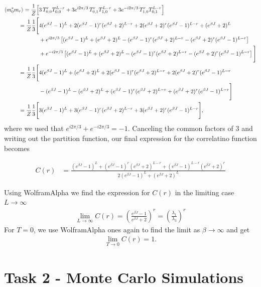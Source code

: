\documentclass[reprint,english,notitlepage,aps,nobalancelastpage,nofootinbib]{revtex4-1}
\newcommand{\closed}[1]{\left(#1\right)}
\newcommand{\bracket}[1]{\left[#1\right]}
\newcommand{\ebj}{e^{\beta J}}
\renewcommand{\l}{\lambda}
\begin{document}
\begin{align*}
	\expval{m_0^* m_r} = \frac{1}{Z} \Big[ &3\, T_{0,0}^r T_{0,0}^{L-r} + 3e^{i2\pi/3}\, T_{0,1}^r T_{1,0}^{L-r} + 3e^{-i2\pi/3}\, T_{1,0}^r T_{0,1}^{L-r} \Big] \\ 
	= \frac{1}{Z} \frac{1}{3} \Bigg[ &4(\ebj-1)^L + 2(\ebj-1)^r (\ebj+2)^{L-r} + 2 (\ebj+2)^r (\ebj-1)^{L-r} + (\ebj+2)^L \\
	& + e^{i2\pi/3}\bracket{ (\ebj-1)^L + (\ebj+2)^L - (\ebj-1)^r (\ebj+2)^{L-r} - (\ebj+2)^r (\ebj-1)^{L-r} } \\
	& + e^{-i2\pi/3} \bracket{(\ebj-1)^L + (\ebj+2)^L - (\ebj-1)^r (\ebj+2)^{L-r} - (\ebj+2)^r (\ebj-1)^{L-r}} \Bigg] \\ 
	= \frac{1}{Z}\frac{1}{3} \Bigg[ & 4(\ebj-1)^L + (\ebj+2)^L + 2(\ebj-1)^r (\ebj+2)^{L-r} + 2 (\ebj+2)^r (\ebj-1)^{L-r} \\
	& - (\ebj-1)^L - (\ebj+2)^L + (\ebj-1)^r (\ebj+2)^{L-r} + (\ebj+2)^r (\ebj-1)^{L-r} \Bigg] \\ 
	= \frac{1}{Z} \frac{1}{3} \Bigg[ & 3(\ebj-1)^L + 3 (\ebj-1)^r (\ebj+2)^{L-r} + 3 (\ebj+2)^r (\ebj-1)^{L-r} \Bigg],
\end{align*}
where we used that $e^{i2\pi/3} + e^{-i2\pi/3}=-1$. Canceling the common factors of $3$ and writing out the partition function, our final expression for the correlatino function becomes 

\begin{align} \label{eq:corr_func_result}
	C(r) &= \frac{(\ebj-1)^L + (\ebj-1)^r (\ebj+2)^{L-r} + (\ebj-1)^{L-r} (\ebj+2)^r}{2(\ebj-1)^L + (\ebj+2)^L}
\end{align}

Using WolframAlpha we find the expression for $C(r)$ in the limiting case $L\to\infty$
\begin{align*}
	\lim_{L\to\infty} C(r) = \closed{\frac{\ebj-1}{\ebj+2}}^r = \closed{\frac{\l_1}{\l_3}}^r
\end{align*}
For $T=0$, we use WolframAlpha ones again to find the limit as $\beta\to\infty$ and get 
\begin{align*}
	\lim_{T\to0} C(r) = 1.
\end{align*}


\section*{\large Task 2 - Monte Carlo Simulations}
\end{document}

